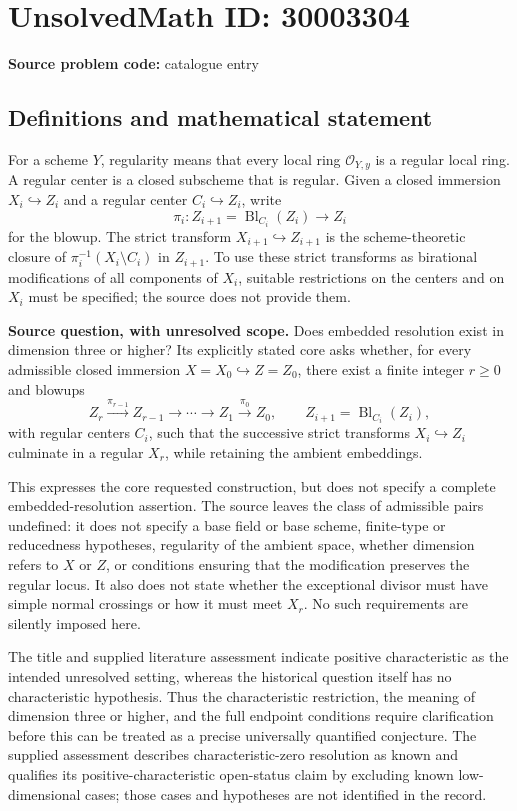 \documentclass[11pt]{article}
\begin{document}
\section*{UnsolvedMath ID: 30003304}
\textbf{Source problem code:} catalogue entry
\subsection{Definitions and mathematical statement}
For a scheme \(Y\), regularity means that every local ring \(\mathcal O_{Y,y}\) is a regular local ring. A regular center is a closed subscheme that is regular. Given a closed immersion \(X_i\hookrightarrow Z_i\) and a regular center \(C_i\hookrightarrow Z_i\), write
\[
\pi_i:Z_{i+1}=\operatorname{Bl}_{C_i}(Z_i)\longrightarrow Z_i
\]
for the blowup. The strict transform \(X_{i+1}\hookrightarrow Z_{i+1}\) is the scheme-theoretic closure of \(\pi_i^{-1}(X_i\setminus C_i)\) in \(Z_{i+1}\). To use these strict transforms as birational modifications of all components of \(X_i\), suitable restrictions on the centers and on \(X_i\) must be specified; the source does not provide them.

\textbf{Source question, with unresolved scope.} Does embedded resolution exist in dimension three or higher? Its explicitly stated core asks whether, for every admissible closed immersion \(X=X_0\hookrightarrow Z=Z_0\), there exist a finite integer \(r\geq 0\) and blowups
\[
Z_r\xrightarrow{\pi_{r-1}}Z_{r-1}\longrightarrow\cdots\longrightarrow Z_1\xrightarrow{\pi_0}Z_0,
\qquad
Z_{i+1}=\operatorname{Bl}_{C_i}(Z_i),
\]
with regular centers \(C_i\), such that the successive strict transforms \(X_i\hookrightarrow Z_i\) culminate in a regular \(X_r\), while retaining the ambient embeddings.

This expresses the core requested construction, but does not specify a complete embedded-resolution assertion. The source leaves the class of admissible pairs undefined: it does not specify a base field or base scheme, finite-type or reducedness hypotheses, regularity of the ambient space, whether dimension refers to \(X\) or \(Z\), or conditions ensuring that the modification preserves the regular locus. It also does not state whether the exceptional divisor must have simple normal crossings or how it must meet \(X_r\). No such requirements are silently imposed here.

The title and supplied literature assessment indicate positive characteristic as the intended unresolved setting, whereas the historical question itself has no characteristic hypothesis. Thus the characteristic restriction, the meaning of dimension three or higher, and the full endpoint conditions require clarification before this can be treated as a precise universally quantified conjecture. The supplied assessment describes characteristic-zero resolution as known and qualifies its positive-characteristic open-status claim by excluding known low-dimensional cases; those cases and hypotheses are not identified in the record.
\end{document}
